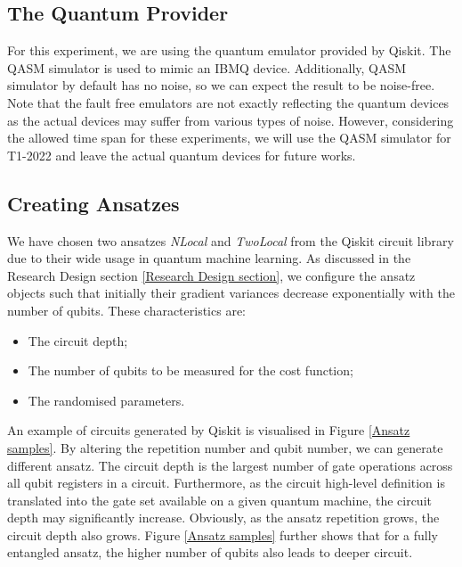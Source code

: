 \subsection{The Quantum Provider}
For this experiment, we are using the quantum emulator provided by Qiskit.
The QASM simulator is used to mimic an IBMQ device.
Additionally, QASM simulator by default has no noise, so we can expect the result to be noise-free.
Note that the fault free emulators are not exactly reflecting the quantum devices as the actual devices may suffer from various types of noise.
However, considering the allowed time span for these experiments, we will use the QASM simulator for T1-2022 and leave the actual quantum devices for future works.


\subsection{Creating Ansatzes}
We have chosen two ansatzes \textit{NLocal} and \textit{TwoLocal} from the Qiskit circuit library due to their wide usage in quantum machine learning.
As discussed in the Research Design section \ref{Research Design section}, we configure the ansatz objects such that initially their gradient variances decrease exponentially with the number of qubits.
These characteristics are:
\begin{itemize}
    \item The circuit depth;
    \item The number of qubits to be measured for the cost function;
    \item The randomised parameters.
\end{itemize}

An example of circuits generated by Qiskit is visualised in Figure \ref{Ansatz samples}.
By altering the repetition number and qubit number, we can generate different ansatz.
The circuit depth is the largest number of gate operations across all qubit registers in a circuit.
Furthermore, as the circuit high-level definition is translated into the gate set available on a given quantum machine, the circuit depth may significantly increase.
Obviously, as the ansatz repetition grows, the circuit depth also grows.
Figure \ref{Ansatz samples} further shows that for a fully entangled ansatz, the higher number of qubits also leads to deeper circuit.

